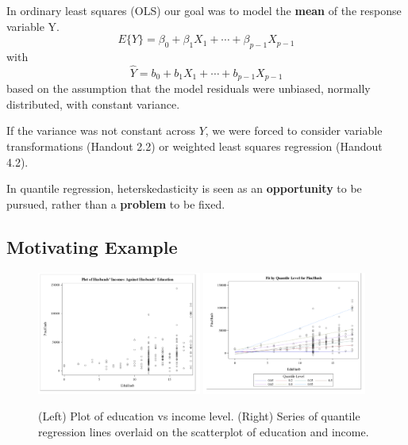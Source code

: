 \documentclass[12pt]{notes}
\begin{document}
In ordinary least squares (OLS) our goal was to model the \textbf{mean} of the response variable Y. 
$$E\{Y\} = \beta_0 + \beta_1X_1 + \cdots + \beta_{p-1}X_{p-1}$$
with 
$$\hat{Y} = b_0 + b_1X_1 + \cdots + b_{p-1}X_{p-1}$$
based on the assumption that the model residuals were unbiased, normally distributed, with constant variance. 

\nspace
If the variance was not constant across $Y$, we were forced to consider variable transformations (Handout 2.2) or weighted least squares regression (Handout 4.2). 

\nspace
In quantile regression, heterskedasticity is seen as an \textbf{opportunity} to be pursued, rather than a \textbf{problem} to be fixed. 

\subsection{Motivating Example}

\begin{figure}[H]
\includegraphics[width=0.48\textwidth]{figures/module7/education_scatter.png}
\includegraphics[width=0.48\textwidth]{figures/module7/education_scatter_2.png}
\caption{(Left) Plot of education vs income level. (Right) Series of quantile regression lines overlaid on the scatterplot of education and income.}
\label{fig:edscatter}
\end{figure}
\end{document}
